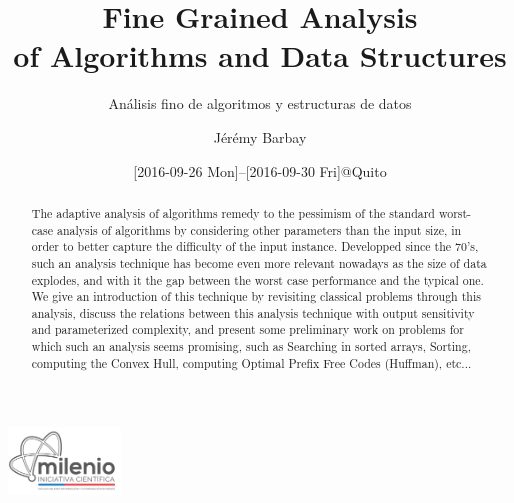 \documentclass{beamer}
\title[Fine Grained Analysis]
{Fine Grained Analysis \\ of Algorithms and Data Structures}
\subtitle{An\'alisis fino de algoritmos y estructuras de datos}
\author{J{\'e}r{\'e}my Barbay}
\institute[DCC, UChile]
{\url{jeremy@barbay.cl}}
\date[Quito]{[2016-09-26 Mon]--[2016-09-30 Fri]@Quito}
\begin{document}
\begin{frame}
  \titlepage
\end{frame}

\begin{frame}
\includegraphics[width=3cm]{logoMilenio}
\vfill
\begin{abstract} \tiny The adaptive analysis of algorithms remedy to the pessimism of the standard worst-case analysis of algorithms by considering other parameters than the input size, in order to better capture the difficulty of the input instance. Developped since the 70's, such an analysis technique has become even more relevant nowadays as the size of data explodes, and with it the gap between the worst case performance and the typical one. We give an introduction of this technique by revisiting classical problems through this analysis, discuss the relations between this analysis technique with output sensitivity and parameterized complexity, and present some preliminary work on problems for which such an analysis seems promising, such as Searching in sorted arrays, Sorting, computing the Convex Hull, computing Optimal Prefix Free Codes (Huffman), etc...
\end{abstract}
\vfill
\end{frame}
\end{document}
